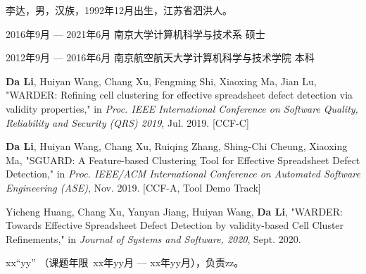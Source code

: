 \documentclass[master, macfonts]{njuthesis}
\begin{document}

\backmatter
\begin{resume}
\begin{authorinfo}
\noindent 李达，男，汉族，1992年12月出生，江苏省泗洪人。
\end{authorinfo}
\begin{education}
\item[2016年9月 --- 2021年6月] 南京大学计算机科学与技术系 \hfill 硕士
\item[2012年9月 --- 2016年6月] 南京航空航天大学计算机科学与技术学院 \hfill 本科
\end{education}
\begin{publications}
  \item \textbf{Da Li}, Huiyan Wang, Chang Xu, Fengming Shi, Xiaoxing Ma, Jian Lu, "WARDER: Refining cell clustering for effective spreadsheet defect detection via validity properties," in \textsl{Proc. IEEE International Conference on Software Quality, Reliability and Security (QRS) 2019}, Jul. 2019. [CCF-C]
  \item \textbf{Da Li}, Huiyan Wang, Chang Xu, Ruiqing Zhang, Shing-Chi Cheung, Xiaoxing Ma, "SGUARD: A Feature-based Clustering Tool for Effective Spreadsheet Defect Detection," in \textsl{Proc. IEEE/ACM International Conference on Automated Software Engineering (ASE)}, Nov. 2019. [CCF-A, Tool Demo Track]
  \item Yicheng Huang, Chang Xu, Yanyan Jiang, Huiyan Wang, \textbf{Da Li}, "WARDER: Towards Effective Spreadsheet Defect Detection by validity-based Cell Cluster Refinements," in \textsl{Journal of Systems and Software, 2020}, Sept. 2020.

\end{publications}
\begin{projects}
\item xx``yy''
（课题年限~xx年yy月 --- xx年yy月），负责zz。
\end{projects}
\end{resume}

\makelicense

\end{document}
